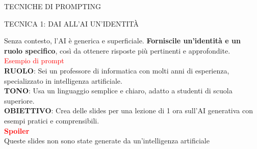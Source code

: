 \documentclass[aspectratio=1610]{beamer}
\begin{document}
\begin{frame}{TECNICHE DI PROMPTING}
    \begin{alertblock}{TECNICA 1: DAI ALL'AI UN'IDENTITÀ}
        \begin{minipage}{0.98\linewidth}
            \justifying
            Senza contesto, l'AI è generica e superficiale. \textbf{Forniscile un'identità e un ruolo specifico}, 
            così da ottenere risposte più pertinenti e approfondite.\\
            \pause
            \bigskip
            \textcolor{red}{Esempio di prompt}\\
            \textbf{RUOLO}: Sei un professore di informatica con molti anni di esperienza, specializzato in intelligenza 
            artificiale.\\
            \textbf{TONO}: Usa un linguaggio semplice e chiaro, adatto a studenti di scuola superiore.\\
            \textbf{OBIETTIVO}: Crea delle slides per una lezione di 1 ora sull'AI generativa con esempi 
            pratici e comprensibili.\\
            \bigskip
            \tiny{\textbf{\textcolor{red}{Spoiler}}}\\
            \tiny{Queste slides non sono state generate da un'intelligenza artificiale}
        \end{minipage}
    \end{alertblock}
\end{frame}
\end{document}
